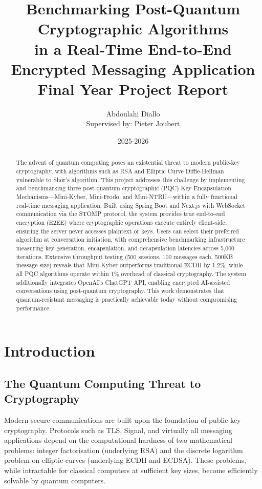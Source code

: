 \documentclass[11pt,a4paper]{article}
\title{
    \vspace{-1cm}
    \textbf{Benchmarking Post-Quantum Cryptographic Algorithms\\in a Real-Time End-to-End Encrypted Messaging Application}\\[0.4cm]
    \large Final Year Project Report\\
}
\author{
    Abdoulahi Diallo\\
    \small Supervised by: Pieter Joubert\\
}
\date{2025-2026}
\begin{document}
\maketitle

\begin{abstract}
\noindent The advent of quantum computing poses an existential threat to modern public-key cryptography, with algorithms such as RSA and Elliptic Curve Diffie-Hellman vulnerable to Shor's algorithm. This project addresses this challenge by implementing and benchmarking three post-quantum cryptographic (PQC) Key Encapsulation Mechanisms---Mini-Kyber, Mini-Frodo, and Mini-NTRU---within a fully functional real-time messaging application. Built using Spring Boot and Next.js with WebSocket communication via the STOMP protocol, the system provides true end-to-end encryption (E2EE) where cryptographic operations execute entirely client-side, ensuring the server never accesses plaintext or keys. Users can select their preferred algorithm at conversation initiation, with comprehensive benchmarking infrastructure measuring key generation, encapsulation, and decapsulation latencies across 5,000 iterations. Extensive throughput testing (500 sessions, 100 messages each, 500KB message size) reveals that Mini-Kyber outperforms traditional ECDH by 1.2\%, while all PQC algorithms operate within 1\% overhead of classical cryptography. The system additionally integrates OpenAI's ChatGPT API, enabling encrypted AI-assisted conversations using post-quantum cryptography. This work demonstrates that quantum-resistant messaging is practically achievable today without compromising performance.
\end{abstract}

\tableofcontents
\newpage

\section{Introduction}

\subsection{The Quantum Computing Threat to Cryptography}

Modern secure communications are built upon the foundation of public-key cryptography. Protocols such as TLS, Signal, and virtually all messaging applications depend on the computational hardness of two mathematical problems: integer factorisation (underlying RSA) and the discrete logarithm problem on elliptic curves (underlying ECDH and ECDSA). These problems, while intractable for classical computers at sufficient key sizes, become efficiently solvable by quantum computers.
\end{document}
